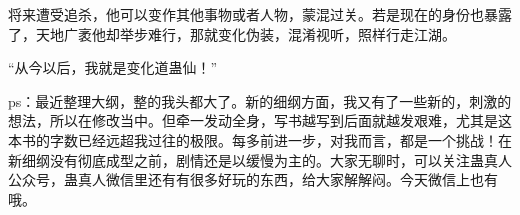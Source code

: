 \begin{this_body}
将来遭受追杀，他可以变作其他事物或者人物，蒙混过关。若是现在的身份也暴露了，天地广袤他却举步难行，那就变化伪装，混淆视听，照样行走江湖。

“从今以后，我就是变化道蛊仙！”

ps：最近整理大纲，整的我头都大了。新的细纲方面，我又有了一些新的，刺激的想法，所以在修改当中。但牵一发动全身，写书越写到后面就越发艰难，尤其是这本书的字数已经远超我过往的极限。每多前进一步，对我而言，都是一个挑战！在新细纲没有彻底成型之前，剧情还是以缓慢为主的。大家无聊时，可以关注蛊真人公众号，蛊真人微信里还有有很多好玩的东西，给大家解解闷。今天微信上也有哦。

\end{this_body}

